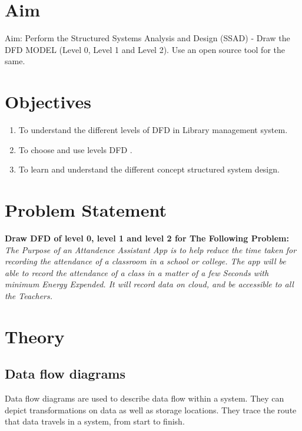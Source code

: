 \documentclass[11pt]{article}
\begin{document}
\tableofcontents
\thispagestyle{empty}
\clearpage

\setcounter{page}{1}

\section{Aim}
Aim: Perform the Structured Systems Analysis and Design (SSAD) - Draw the DFD MODEL
(Level 0, Level 1 and Level 2). Use an open source tool for the same.


\section{Objectives}

\begin{enumerate}
	\item To understand the different levels of DFD in Library management system.
	\item To choose and use levels DFD .
	\item To learn and understand the different concept structured system design.
\end{enumerate}

\section{Problem Statement}

\textbf{Draw DFD of level 0, level 1 and level 2 for The Following Problem:} \\

\textit{The Purpose of an Attandence Assistant App is to help reduce the time taken for recording the attendance of a classroom in a school or college. The app will be able to record the attendance of a class in a matter of a few Seconds with minimum Energy Expended. It will record data on cloud, and be accessible to all the Teachers.}\\


\section{Theory}

\subsection{Data flow diagrams}
Data flow diagrams are used to describe data flow within a system. They can depict transformations on
data as well as storage locations. They trace the route that data travels in a system, from start to finish.
\end{document}
